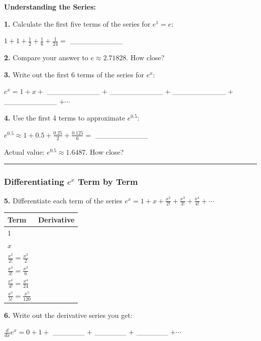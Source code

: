 \documentclass[
  11pt,
]{article}
\begin{document}
\textbf{Understanding the Series:}

\textbf{1.} Calculate the first five terms of the series for
\(e^1 = e\):

\(1 + 1 + \frac{1}{2} + \frac{1}{6} + \frac{1}{24} ={}\)
\_\_\_\_\_\_\_\_\_\_

\textbf{2.} Compare your answer to \(e \approx 2.71828\). How close?

\textbf{3.} Write out the first 6 terms of the series for \(e^x\):

\(e^x = 1 + x +{}\) \_\_\_\_\_\_\_\_\_\_ \(+\) \_\_\_\_\_\_\_\_\_\_
\(+\) \_\_\_\_\_\_\_\_\_\_ \(+\) \_\_\_\_\_\_\_\_\_\_ \(+ \cdots\)

\textbf{4.} Use the first 4 terms to approximate \(e^{0.5}\):

\(e^{0.5} \approx 1 + 0.5 + \frac{0.25}{2} + \frac{0.125}{6} ={}\)
\_\_\_\_\_\_\_\_\_\_

Actual value: \(e^{0.5} \approx 1.6487\). How close?

\begin{center}\rule{0.5\linewidth}{0.5pt}\end{center}

\hypertarget{differentiating-ex-term-by-term}{%
\subsubsection{\texorpdfstring{Differentiating \(e^x\) Term by
Term}{Differentiating e\^{}x Term by Term}}\label{differentiating-ex-term-by-term}}

\textbf{5.} Differentiate each term of the series
\(e^x = 1 + x + \frac{x^2}{2!} + \frac{x^3}{3!} + \frac{x^4}{4!} + \cdots\)

\begin{longtable}[]{@{}ll@{}}
\toprule\noalign{}
Term & Derivative \\
\midrule\noalign{}
\endhead
\bottomrule\noalign{}
\endlastfoot
\(1\) & \\
\(x\) & \\
\(\frac{x^2}{2!} = \frac{x^2}{2}\) & \\
\(\frac{x^3}{3!} = \frac{x^3}{6}\) & \\
\(\frac{x^4}{4!} = \frac{x^4}{24}\) & \\
\(\frac{x^5}{5!} = \frac{x^5}{120}\) & \\
\end{longtable}

\textbf{6.} Write out the derivative series you get:

\(\frac{d}{dx}e^x = 0 + 1 +{}\) \_\_\_\_\_\_ \(+\) \_\_\_\_\_\_ \(+\)
\_\_\_\_\_\_ \(+ \cdots\)
\end{document}
